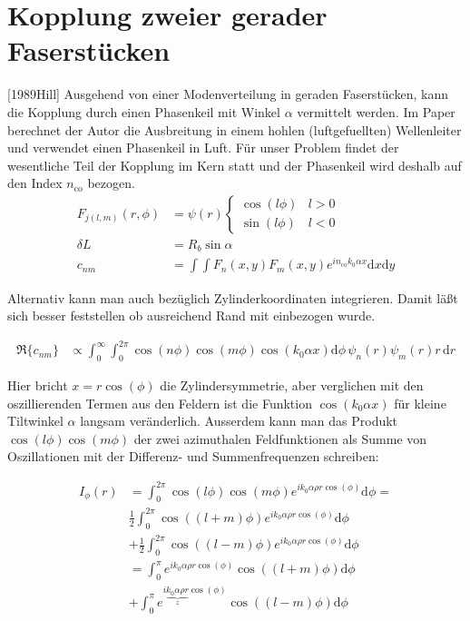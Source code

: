 \documentclass[DIV19,twocolumn]{scrartcl}
\def\({\left(}
\def\){\right)}
\newcommand{\nco}{n_\textrm{co}}
\begin{document}
\section{Kopplung zweier gerader Faserst\"ucken}
[1989Hill]
Ausgehend von einer Modenverteilung in geraden Faserst\"ucken, kann
die Kopplung durch einen Phasenkeil mit Winkel $\alpha$ vermittelt
werden. Im Paper berechnet der Autor die Ausbreitung in einem hohlen
(luftgefuellten) Wellenleiter und verwendet einen Phasenkeil in
Luft. F\"ur unser Problem findet der wesentliche Teil der Kopplung im
Kern statt und der Phasenkeil wird deshalb auf den Index $\nco$
bezogen.
\begin{align}
  F_{j(l,m)}(r,\phi) &= \psi(r) 
  \begin{cases}
    \cos(l \phi) & l>0\\  
    \sin(l \phi) & l<0
  \end{cases} \\
  \delta L &= R_b \sin\alpha\\
  c_{nm}&=\int\!\!\!\int\! F_n(x,y)F_m(x,y) e^{i\nco k_0\alpha x} \textrm{d}x \textrm{d}y
\end{align}

Alternativ kann man auch bez\"uglich Zylinderkoordinaten
integrieren. Damit l\"a\ss t sich besser feststellen ob ausreichend
Rand mit einbezogen wurde.

\begin{align}
  \Re\{c_{nm}\}&\propto\int_0^{\infty}\!\!\!\!\int_0^{2\pi}\!\!\!\!\!\! \cos(n\phi)\cos(m\phi) \cos(k_0\alpha x) \textrm{d}\phi\, \psi_n(r) \psi_m(r) r\, \textrm{d}r 
\end{align}

Hier bricht $x=r \cos(\phi)$ die Zylindersymmetrie, aber verglichen
mit den oszillierenden Termen aus den Feldern ist die Funktion
$\cos(k_0\alpha x)$ f\"ur kleine Tiltwinkel $\alpha$ langsam
ver\"anderlich. Ausserdem kann man das Produkt
$\cos(l\phi)\cos(m\phi)$ der zwei azimuthalen Feldfunktionen als Summe
von Oszillationen mit der Differenz- und Summenfrequenzen schreiben:



\begin{align}
  I_\phi(r) &= \int_0^{2\pi}\!\!\!\!\!\! \cos(l\phi)\cos(m\phi) e^{ik_0\alpha\rho r\cos(\phi)} \textrm{d}\phi = \nonumber \\
  &\frac{1}{2}\int_0^{2\pi}\!\!\!\!\!\! \cos\((l+m)\phi\) e^{ik_0\alpha\rho r\cos(\phi)} \textrm{d}\phi  \nonumber \\
  &+ \frac{1}{2}\int_0^{2\pi}\!\!\!\!\!\! \cos\((l-m)\phi\) e^{ik_0\alpha\rho r\cos(\phi)} \textrm{d}\phi \nonumber \\
  &=  \int_0^{\pi}\! e^{ik_0\alpha\rho r\cos(\phi)} \cos\((l+m)\phi\) \textrm{d}\phi  \nonumber \\
  &+ \int_0^{\pi}\! e^{i\underbrace{k_0\alpha\rho r}_z\cos(\phi)} \cos\((l-m)\phi\)  \textrm{d}\phi
\end{align}
\end{document}

